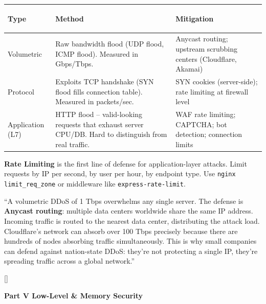 \documentclass[11pt, letterpaper]{article}
\newcommand{\greysections}{%
  \titleformat{\section}{\large\bfseries\color{sectiongrey}}{}{0em}{}[\color{sectiongrey}\titlerule]%
  \titleformat{\subsection}{\normalsize\bfseries\color{sectiongrey!80!black}}{}{0em}{}%
}
\newcommand{\partbanner}[3]{%
  \begin{tcolorbox}[colback=#1, colframe=#2, boxrule=1.2pt, arc=4pt,
    left=8pt, right=8pt, top=6pt, bottom=6pt]
    \begin{center}{\LARGE\bfseries #3}\end{center}
  \end{tcolorbox}%
}
\newcommand{\talkingpoint}[1]{%
  \begin{tcolorbox}[colback=talkbg, colframe=talkborder,
    title={\bfseries Interview Talking Point}, arc=3pt, boxrule=1pt]
  #1
  \end{tcolorbox}%
}
\begin{document}
\noindent
{\renewcommand{\arraystretch}{1.5}
\begin{tabularx}{\textwidth}{>{\bfseries\raggedright\arraybackslash}p{3cm}
                              >{\raggedright\arraybackslash}X
                              >{\raggedright\arraybackslash}p{3.5cm}}
\toprule
\rowcolor{tableheaderorange}
\textbf{Type} & \textbf{Method} & \textbf{Mitigation} \\
\midrule
\rowcolor{rowOr} Volumetric & Raw bandwidth flood (UDP flood, ICMP flood). Measured in Gbps/Tbps. & Anycast routing; upstream scrubbing centers (Cloudflare, Akamai) \\
\rowcolor{rowA}  Protocol   & Exploits TCP handshake (SYN flood fills connection table). Measured in packets/sec. & SYN cookies (server-side); rate limiting at firewall level \\
\rowcolor{rowOr} Application (L7) & HTTP flood -- valid-looking requests that exhaust server CPU/DB. Hard to distinguish from real traffic. & WAF rate limiting; CAPTCHA; bot detection; connection limits \\
\bottomrule
\end{tabularx}}

\textbf{Rate Limiting} is the first line of defense for application-layer attacks. Limit requests by IP per second, by user per hour, by endpoint type. Use \texttt{nginx limit\_req\_zone} or middleware like \texttt{express-rate-limit}.

\talkingpoint{``A volumetric DDoS of 1 Tbps overwhelms any single server. The defense is \textbf{Anycast routing}: multiple data centers worldwide share the same IP address. Incoming traffic is routed to the nearest data center, distributing the attack load. Cloudflare's network can absorb over 100 Tbps precisely because there are hundreds of nodes absorbing traffic simultaneously. This is why small companies can defend against nation-state DDoS: they're not protecting a single IP, they're spreading traffic across a global network.''}

\newpage

\greysections
{}
\partbanner{part7bg}{sectiongrey}{Part V \quad Low-Level \& Memory Security}
\end{document}
